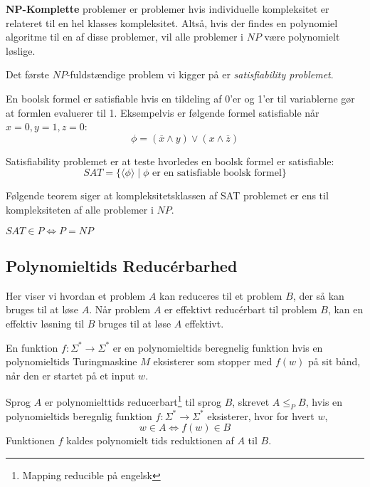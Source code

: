 
\textbf{NP-Komplette} problemer er problemer hvis individuelle kompleksitet er relateret til en hel klasses kompleksitet. Altså, hvis der findes en polynomiel algoritme til en af disse problemer, vil alle problemer i $NP$ være polynomielt løslige.

Det første $NP$-fuldstændige problem vi kigger på er \textit{satisfiability problemet}.

En boolsk formel er satisfiable hvis en tildeling af 0'er og 1'er til variablerne gør at formlen evaluerer til 1. Eksempelvis er følgende formel satisfiable når $x = 0, y = 1, z = 0$:
\begin{equation*}
\phi = (\overline{x} \land y) \lor (x \land \overline{z})
\end{equation*}

Satisfiability problemet er at teste hvorledes en boolsk formel er satisfiable:
\begin{equation*}
SAT = \{ \langle \phi \rangle \mid \phi \text{ er en satisfiable boolsk formel}\}
\end{equation*}

Følgende teorem siger at kompleksitetsklassen af SAT problemet er ens til kompleksiteten af alle problemer i $NP$.

\begin{theorem}
$SAT \in P \iff P = NP$
\end{theorem}

\subsection{Polynomieltids Reducérbarhed}%
\label{subsec:polynomialreducibility}

Her viser vi hvordan et problem $A$ kan reduceres til et problem $B$, der så kan bruges til at løse $A$. Når problem $A$ er effektivt reducérbart til problem $B$, kan en effektiv løsning til $B$ bruges til at løse $A$ effektivt.

\begin{definition}
En funktion $f : \Sigma^{*} \longrightarrow \Sigma^{*}$ er en polynomieltids beregnelig funktion hvis en polynomieltids Turingmaskine $M$ eksisterer som stopper med $f(w)$ på sit bånd, når den er startet på et input $w$.
\end{definition}

\begin{definition}
  Sprog $A$ er polynomielttids reducerbart\footnote{Mapping reducible på engelsk} til sprog $B$, skrevet $A \leq_{P} B$, hvis en polynomieltids beregnlig funktion $f : \Sigma^{*} \longrightarrow \Sigma^{*}$ eksisterer, hvor for hvert $w$,
  \begin{equation*}
w \in A \iff f(w) \in B
\end{equation*}
Funktionen $f$ kaldes polynomielt tids reduktionen af $A$ til $B$.
\end{definition}

